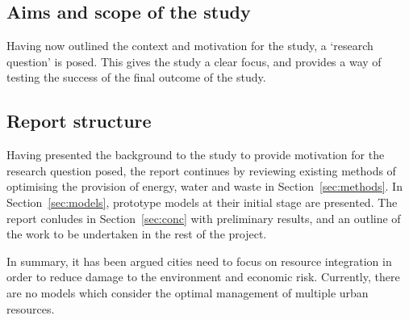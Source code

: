 \subsection{Aims and scope of the study}
Having now outlined the context and motivation for the study, a `research question' is posed. This gives the study a clear focus, and provides a way of testing the success of the final outcome of the study.


\subsection{Report structure}
Having presented the background to the study to provide motivation for the research question posed, the report continues by reviewing existing methods of optimising the provision of energy, water and waste in Section~\ref{sec:methods}. In Section~\ref{sec:models}, prototype models at their initial stage are presented. The report conludes in Section~\ref{sec:conc} with preliminary results, and an outline of the work to be undertaken in the rest of the project.

In summary, it has been argued cities need to focus on resource integration in order to reduce damage to the environment and economic risk. Currently, there are no models which consider the optimal management of multiple urban resources.
